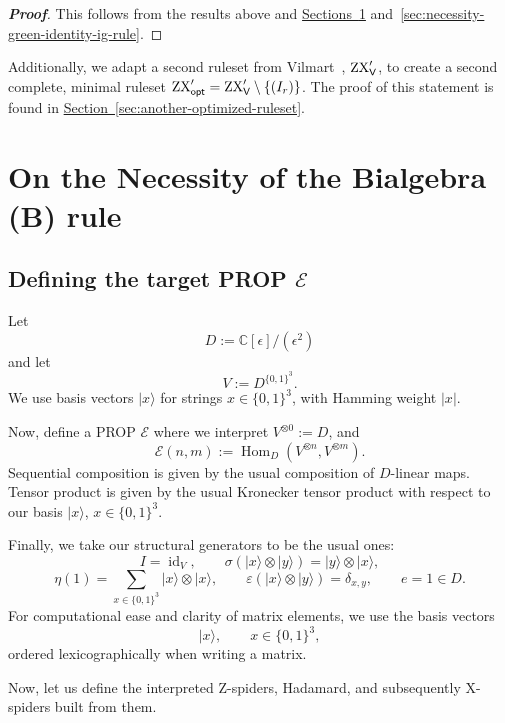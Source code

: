 \documentclass[copyright,creativecommons]{eptcs}
\newenvironment{irproof}
	{\begingroup\begin{proof}[\normalfont\bfseries Proof]}
	{\end{proof}\endgroup}
\newcommand{\zxvprime}{\ensuremath{\textup{ZX}_{\textsf{V}}'}\xspace}
\newcommand{\zxoptprime}{\ensuremath{\textup{ZX}_{\textsf{opt}}'}\xspace}
\theoremstyle{definition}
\theoremstyle{remark}
\begin{document}
\begin{irproof}
This follows from the results above and
\hyperref[sec:necessity-bialgebra-b-rule]{Sections~\ref*{sec:necessity-bialgebra-b-rule}}
and~\hyperref[sec:necessity-green-identity-ig-rule]{\ref*{sec:necessity-green-identity-ig-rule}}.
\end{irproof}

Additionally, we adapt a second ruleset from Vilmart~\cite{8785765}, \(\zxvprime\), to create a second complete, minimal ruleset \(\zxoptprime=\zxvprime\setminus\{(I_r)\}\). The proof of this statement is found in \hyperref[sec:another-optimized-ruleset]{Section~\ref*{sec:another-optimized-ruleset}}.

\section{On the Necessity of the Bialgebra (B) rule}
\label{sec:necessity-bialgebra-b-rule}

\subsection{Defining the target PROP \texorpdfstring{\(\mathcal E\)}{E}}
\label{sec:defining-target-category-e}

Let
\[
D:=\mathbb C[\epsilon]/(\epsilon^2)
\]
and let
\[
V:=D^{\{0,1\}^3}.
\]
We use basis vectors \(\lvert x\rangle\) for strings \(x\in\{0,1\}^3\), with Hamming weight \(\lvert x\rvert\).

Now, define a PROP \(\mathcal E\) where we interpret \(V^{\otimes 0}:=D\), and
\[
\mathcal E(n,m):=\operatorname{Hom}_D(V^{\otimes n},V^{\otimes m}).
\]
Sequential composition is given by the usual composition of \(D\)-linear maps.
Tensor product is given by the usual Kronecker tensor product with respect to our basis \(\lvert x\rangle\), \(x\in\{0,1\}^3\).

Finally, we take our structural generators to be the usual ones:
\[
I=\operatorname{id}_V,\qquad
\sigma(\lvert x\rangle\otimes\lvert y\rangle)
=
\lvert y\rangle\otimes\lvert x\rangle,
\]
\[
\eta(1)=\sum_{x\in\{0,1\}^3}\lvert x\rangle\otimes\lvert x\rangle,
\qquad
\varepsilon(\lvert x\rangle\otimes\lvert y\rangle)=\delta_{x,y},
\qquad
e=1\in D.
\]
For computational ease and clarity of matrix elements, we use the basis vectors
\[
\lvert x\rangle,\qquad x\in\{0,1\}^3,
\]
ordered lexicographically when writing a matrix.

Now, let us define the interpreted Z-spiders, Hadamard, and subsequently X-spiders built from them.
\end{document}
